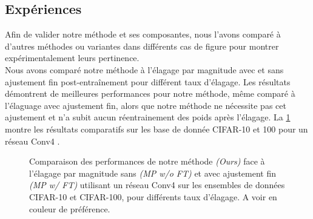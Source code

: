 \subsection*{Expériences}

Afin de valider notre méthode et ses composantes, nous l'avons comparé à
d'autres méthodes ou variantes dans différents cas de figure pour montrer
expérimentalement leurs pertinence.\\

Nous avons comparé notre méthode à l'élagage par magnitude avec et sans
ajustement fin post-entraînement pour différent taux d'élagage. Les résultats
démontrent de meilleures performances pour notre méthode, même comparé à
l'élaguage avec ajustement fin, alors que notre méthode ne nécessite pas cet
ajustement et n'a subit aucun réentrainement des poids après l'élagage. La
\cref{fig:chap1:reparam_vs_mpft_conv4} montre les résultats comparatifs sur les
base de donnée CIFAR-10 et 100 \cite{CIFARdataset} pour un réseau Conv4
\cite{DBLP:conf/iclr/FrankleC19}.\\


\begin{figure}
  \centering
   \caption{ Comparaison des
    performances de notre méthode {\em(Ours)} face à l'élagage par magnitude
    sans {\em(MP w/o FT)} et avec ajustement fin {\em(MP w/ FT)} utilisant un
    réseau Conv4 sur les ensembles de données CIFAR-10 et CIFAR-100, pour
    différents taux d'élagage. A voir en couleur de préférence.}
  \label{fig:chap1:reparam_vs_mpft_conv4}
\end{figure}


